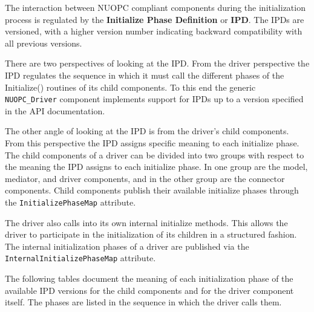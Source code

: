 %

\label{IPD}

The interaction between NUOPC compliant components during the initialization process is regulated by the {\bf Initialize Phase Definition} or {\bf IPD}. The IPDs are versioned, with a higher version number indicating backward compatibility with all previous versions.

There are two perspectives of looking at the IPD. From the driver perspective the IPD regulates the sequence in which it must call the different phases of the Initialize() routines of its child components. To this end the generic {\tt NUOPC\_Driver} component implements support for IPDs up to a version specified in the API documentation.

The other angle of looking at the IPD is from the driver's child components. From this perspective the IPD assigns specific meaning to each initialize phase. The child components of a driver can be divided into two groups with respect to the meaning the IPD assigns to each initialize phase. In one group are the model, mediator, and driver components, and in the other group are the connector components. Child components publish their available initialize phases through the {\tt InitializePhaseMap} attribute.

The driver also calls into its own internal initialize methods. This allows the driver to participate in the initialization of its children in a structured fashion. The internal initialization phases of a driver are published via the {\tt InternalInitializePhaseMap} attribute.

The following tables document the meaning of each initialization phase of the available IPD versions for the child components and for the driver component itself. The phases are listed in the sequence in which the driver calls them.
\newline

